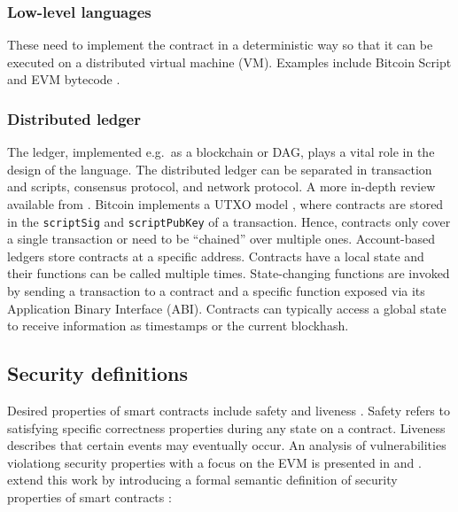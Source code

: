 \subsubsection{Low-level languages} These need to implement the contract in a deterministic way so that it can be executed on a distributed virtual machine (VM). Examples include Bitcoin Script \cite{BitcoinWiki2018Script} and EVM bytecode \cite{Wood2014}.

\subsubsection{Distributed ledger} The ledger, implemented e.g.\ as a blockchain or DAG, plays a vital role in the design of the language. 
The distributed ledger can be separated in transaction and scripts, consensus protocol, and network protocol. 
A more in-depth review available from \cite{Bonneau2015}.
Bitcoin implements a UTXO model \cite{Nakamoto2008,Covaci2018}, where contracts are stored in the \texttt{scriptSig} and \texttt{scriptPubKey} of a transaction. 
Hence, contracts only cover a single transaction or need to be ``chained'' over multiple ones.
Account-based ledgers store contracts at a specific address.
Contracts have a local state and their functions can be called multiple times.
State-changing functions are invoked by sending a transaction to a contract and a specific function exposed via its Application Binary Interface (ABI).
Contracts can typically access a global state to receive information as timestamps or the current blockhash. 



\subsection{Security definitions}
Desired properties of smart contracts include safety and liveness \cite{Sergey2018}.
Safety refers to satisfying specific correctness properties during any state on a contract.
Liveness describes that certain events may eventually occur.
An analysis of vulnerabilities violationg security properties with a focus on the EVM is presented in \cite{Luu2016} and \cite{Atzei2017}.
\citeauthor{Grishchenko2018} extend this work by introducing a formal semantic definition of security properties of smart contracts \cite{Grishchenko2018}:


